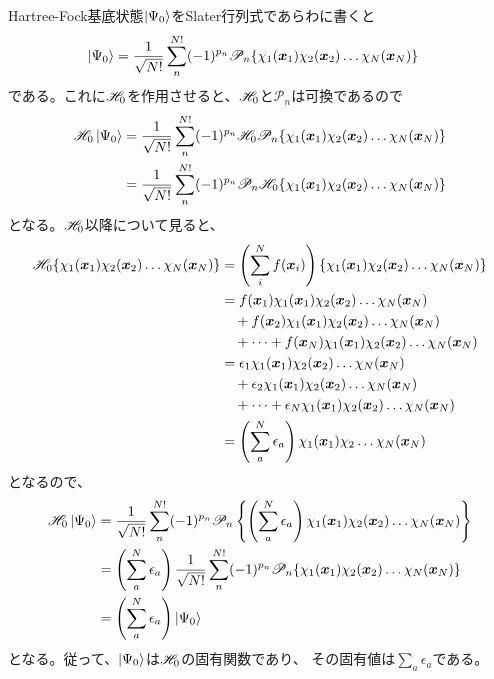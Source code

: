 Hartree-Fock基底状態$\ket{\Psi_0}$をSlater行列式であらわに書くと
\begin{align}
	\ket{\Psi_0}
&=
	\frac{1}{\sqrt{N!}}
	\sum_{n}^{N!}
		(-1)^{p_n}
		\mathscr{P}_n\{
			\chi_1({\bm{x}}_1)\chi_2({\bm{x}}_2)\dots\chi_N({\bm{x}}_N)
		\}
\end{align}
である。これに${\mathscr{H}}_0$を作用させると、${\mathscr{H}}_0$と$\mathscr{P}_n$は可換であるので
\begin{align}
	\H_0 \ket{\Psi_0}
&=
	\frac{1}{\sqrt{N!}}
	\sum_{n}^{N!}
		(-1)^{p_n}
		\H_0
		\mathscr{P}_n\{
			\chi_1(\x_1)\chi_2(\x_2)\dots\chi_N(\x_N)
		\} \\
%
%
&=
	\frac{1}{\sqrt{N!}}
	\sum_{n}^{N!}
		(-1)^{p_n}
		\mathscr{P}_n
		\H_0\{
			\chi_1(\x_1)\chi_2(\x_2)\dots\chi_N(\x_N)
		\}
\end{align}
となる。${\mathscr{H}}_0$以降について見ると、
\begin{align}
	\H_0\{
		\chi_1(\x_1)\chi_2(\x_2)\dots\chi_N(\x_N)
	\}
&=
	\left(
		\sum_{i}^{N} f(\x_i)
	\right)\{
		\chi_1(\x_1)\chi_2(\x_2)\dots\chi_N(\x_N)
	\} \\
%
%
&=
	f(\x_1) \chi_1(\x_1)\chi_2(\x_2)\dots\chi_N(\x_N) \nonumber \\&\quad
	+
	f(\x_2) \chi_1(\x_1)\chi_2(\x_2)\dots\chi_N(\x_N) \nonumber \\&\quad
	+
	\dots
	+
	f(\x_N) \chi_1(\x_1)\chi_2(\x_2)\dots\chi_N(\x_N) \\
%
%
&=
	\epsilon_1 \chi_1(\x_1)\chi_2(\x_2)\dots\chi_N(\x_N) \nonumber \\&\quad
	+
	\epsilon_2 \chi_1(\x_1)\chi_2(\x_2)\dots\chi_N(\x_N) \nonumber \\&\quad
	+
	\dots
	+
	\epsilon_N \chi_1(\x_1)\chi_2(\x_2)\dots\chi_N(\x_N) \\
%
%
&=
	\left(
		\sum_{a}^{N} \epsilon_a
	\right)
	\chi_1(\x_1)\chi_2\dots\chi_N(\x_N)
\end{align}
となるので、
\begin{align}
	\H_0\ket{\Psi_0}
&=
	\frac{1}{\sqrt{N!}}
	\sum_{n}^{N!}
		(-1)^{p_n}
		\mathscr{P}_n\left\{
			\left(
				\sum_{a}^{N} \epsilon_a
			\right)
			\chi_1(\x_1)\chi_2(\x_2)\dots\chi_N(\x_N)
		\right\} \\
%
%
&=
	\left(
		\sum_{a}^{N} \epsilon_a
	\right)
	\frac{1}{\sqrt{N!}}
	\sum_{n}^{N!}
		(-1)^{p_n}
		\mathscr{P}_n\{
			\chi_1(\x_1)\chi_2(\x_2)\dots\chi_N(\x_N)
		\} \\
%
%
&=
	\left(
		\sum_{a}^{N} \epsilon_a
	\right)
	\ket{\Psi_0}
\end{align}
となる。従って、$\ket{\Psi_0}$は${\mathscr{H}}_0$の固有関数であり、
その固有値は$\sum_a \epsilon_a$である。

